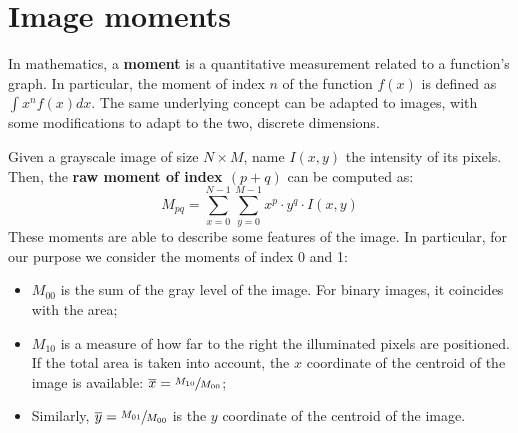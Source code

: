 \section{Image moments}
\label{sec:backgr:moments}

In mathematics, a \textbf{moment} is a quantitative measurement related to a function's graph.
In particular, the moment of index $n$ of the function $f(x)$ is defined as $\int x^n f(x) dx$.
The same underlying concept can be adapted to images, with some modifications to adapt to the two, discrete dimensions.

Given a grayscale image of size $N{\times}M$, name $I(x,y)$ the intensity of its pixels.
Then, the \textbf{raw moment of index $(p{+}q)$} can be computed as: $$M_{pq} = \sum_{x=0}^{N-1} \sum_{y=0}^{M-1} x^p{\cdot}y^q{\cdot}I(x,y)$$
These moments are able to describe some features of the image.
In particular, for our purpose we consider the moments of index 0 and 1:
\begin{itemize}
	\itemsep 0em
	\item $M_{00}$ is the sum of the gray level of the image. For binary images, it coincides with the area;
	\item $M_{10}$ is a measure of how far to the right the illuminated pixels are positioned. If the total area is taken into account, the $x$ coordinate of the centroid of the image is available: $\overline{x} = \sfrac{M_{10}}{M_{00}}$;
	\item Similarly, $\overline{y} = \sfrac{M_{01}}{M_{00}}$ is the $y$ coordinate of the centroid of the image.
\end{itemize}
